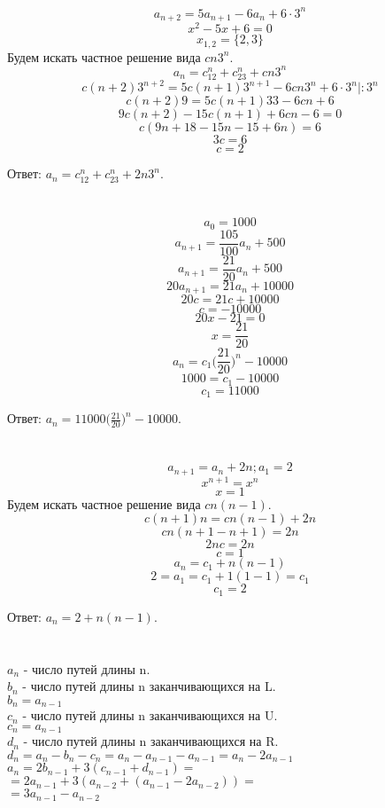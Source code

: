 \documentclass{article}
\begin{document}
\section{}

$$a_{n+2}=5a_{n+1}-6a_n+6\cdot3^n$$
$$x^2-5x+6=0$$
$$x_{1,2}=\{2,3\}$$
Будем искать частное решение вида $cn3^n$.
$$a_n=c_12^n+c_23^n+cn3^n$$
$$c(n+2)3^{n+2}=5c(n+1)3^{n+1}-6cn3^n+6\cdot3^n  | :3^n$$ 
$$c(n+2)9=5c(n+1)33-6cn+6$$
$$9c(n+2)-15c(n+1)+6cn-6=0$$
$$c(9n+18-15n-15+6n)=6$$
$$3c=6$$
$$c=2$$

Ответ: $a_n=c_12^n+c_23^n+2n3^n$.

\section{}

$$a_0=1000$$
$$a_{n+1}=\frac{105}{100}a_n+500$$
$$a_{n+1}=\frac{21}{20}a_n+500$$
$$20a_{n+1}=21a_n+10000$$
$$20c=21c+10000$$
$$c=-10000$$
$$20x-21=0$$
$$x=\frac{21}{20}$$
$$a_n=c_1\Big(\frac{21}{20}\Big)^n-10000$$
$$1000=c_1-10000$$
$$c_1=11000$$

Ответ: $a_n=11000\big(\frac{21}{20}\big)^n-10000$.

\section{}

$$a_{n+1} = a_n + 2n; a_1=2$$
$$x^{n+1} = x^n$$
$$x = 1$$
Будем искать частное решение вида $cn(n-1)$.
$$c(n+1)n=cn(n-1)+2n$$
$$cn(n+1-n+1)=2n$$
$$2nc=2n$$
$$c=1$$
$$a_n=c_1+n(n-1)$$
$$2=a_1=c_1+1(1-1)=c_1$$
$$c_1=2$$

Ответ: $a_n=2+n(n-1)$.

\section{}

$a_n$ - число путей длины n.\\
$b_n$ - число путей длины n заканчивающихся на L.\\
$b_n=a_{n-1}$\\
$c_n$ - число путей длины n заканчивающихся на U.\\
$c_n=a_{n-1}$\\
$d_n$ - число путей длины n заканчивающихся на R.\\
$d_n=a_n-b_n-c_n=a_n-a_{n-1}-a_{n-1}=a_n-2a_{n-1}$\\
$a_n=2b_{n-1}+3(c_{n-1}+d_{n-1})=$\\
$=2a_{n-1}+3(a_{n-2}+(a_{n-1}-2a_{n-2}))=$\\
$=3a_{n-1}-a_{n-2}$\\
\end{document}
